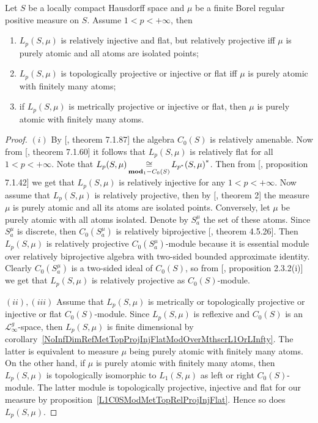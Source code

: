 \begin{proposition}\label{LpC0SModMetTopRelProjIngFlat} Let $S$ be a locally
compact Hausdorff space and $\mu$ be a finite Borel regular positive measure on
$S$. Assume $1<p<+\infty$, then 

\begin{enumerate}[label = (\roman*)]
    \item $L_p(S,\mu)$ is relatively injective and flat, but relatively 
    projective iff $\mu$ is purely atomic and all atoms are isolated points;

    \item $L_p(S,\mu)$ is topologically projective or injective or flat 
    iff $\mu$ is purely atomic with finitely many atoms;

    \item if $L_p(S,\mu)$ is metrically projective or injective or flat, 
    then $\mu$ is purely atomic with finitely many atoms.
\end{enumerate}
\end{proposition}
\begin{proof} $(i)$ By [\cite{HelBanLocConvAlg}, theorem 7.1.87] the algebra
$C_0(S)$ is relatively amenable. Now from [\cite{HelBanLocConvAlg}, theorem
7.1.60] it follows that $L_p(S,\mu)$ is relatively flat for all $1<p<+\infty$.
Note that $L_p(S,\mu)\mathop{\mathbin{\cong}}\limits_{\mathbf{mod}_1-C_0(S)}{L_{p^*}(S,\mu)}^*$. Then from
[\cite{HelBanLocConvAlg}, proposition 7.1.42] we get that $L_p(S,\mu)$ is
relatively injective for any $1<p<+\infty$. Now assume that $L_p(S,\mu)$ is
relatively projective, then by [\cite{NemRelProjModLp}, theorem 2]
the measure $\mu$ is purely atomic and all its atoms are isolated points.
Conversely, let $\mu$ be purely atomic with all atoms isolated. Denote by
$S_a^{\mu}$ the set of these atoms. Since $S_a^{\mu}$ is discrete, then
$C_0(S_a^{\mu})$ is relatively biprojective [\cite{HelHomolBanTopAlg}, theorem
4.5.26]. Then $L_p(S,\mu)$ is relatively projective $C_0(S_a^{\mu})$-module
because it is essential module over relatively biprojective algebra with
two-sided bounded approximate identity. Clearly $C_0(S_a^{\mu})$ is a two-sided
ideal of $C_0(S)$, so from [\cite{RamsHomPropSemgroupAlg}, proposition 2.3.2(i)]
we get that $L_p(S,\mu)$ is relatively projective as $C_0(S)$-module.

$(ii), (iii)$ Assume that $L_p(S,\mu)$ is metrically or topologically projective
or injective or flat $C_0(S)$-module. Since $L_p(S,\mu)$ is reflexive and
$C_0(S)$ is an $\mathscr{L}_\infty^g$-space, then $L_p(S,\mu)$ is finite
dimensional by
corollary~\ref{NoInfDimRefMetTopProjInjFlatModOverMthscrL1OrLInfty}. The latter
is equivalent to measure $\mu$ being purely atomic with finitely many atoms. On
the other hand, if $\mu$ is purely atomic with finitely many atoms, then
$L_p(S,\mu)$ is topologically isomorphic to $L_1(S,\mu)$ as left or right
$C_0(S)$-module. The latter module is topologically projective, injective and
flat for our measure by proposition~\ref{L1C0SModMetTopRelProjInjFlat}. Hence so
does $L_p(S,\mu)$.
\end{proof}

